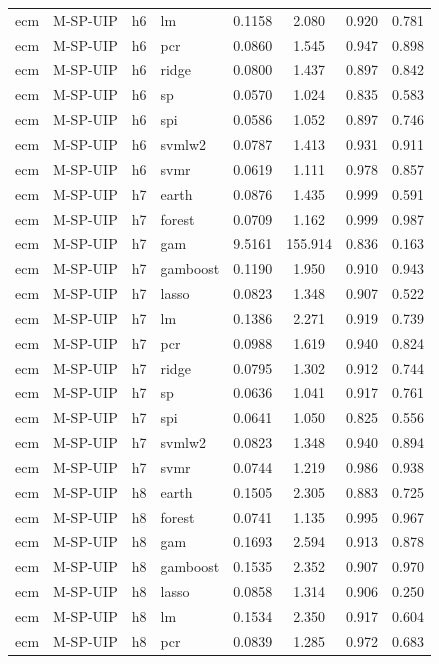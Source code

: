 \begin{ThreePartTable}
\begin{longtable}[t]{llclcccc}
ecm & M-SP-UIP & h6 & lm & 0.1158 & 2.080 & 0.920 & 0.781\\
ecm & M-SP-UIP & h6 & pcr & 0.0860 & 1.545 & 0.947 & 0.898\\
ecm & M-SP-UIP & h6 & ridge & 0.0800 & 1.437 & 0.897 & 0.842\\
ecm & M-SP-UIP & h6 & sp & 0.0570 & 1.024 & 0.835 & 0.583\\
ecm & M-SP-UIP & h6 & spi & 0.0586 & 1.052 & 0.897 & 0.746\\
ecm & M-SP-UIP & h6 & svmlw2 & 0.0787 & 1.413 & 0.931 & 0.911\\
ecm & M-SP-UIP & h6 & svmr & 0.0619 & 1.111 & 0.978 & 0.857\\
\addlinespace
ecm & M-SP-UIP & h7 & earth & 0.0876 & 1.435 & 0.999 & 0.591\\
ecm & M-SP-UIP & h7 & forest & 0.0709 & 1.162 & 0.999 & 0.987\\
ecm & M-SP-UIP & h7 & gam & 9.5161 & 155.914 & 0.836 & 0.163\\
ecm & M-SP-UIP & h7 & gamboost & 0.1190 & 1.950 & 0.910 & 0.943\\
ecm & M-SP-UIP & h7 & lasso & 0.0823 & 1.348 & 0.907 & 0.522\\
ecm & M-SP-UIP & h7 & lm & 0.1386 & 2.271 & 0.919 & 0.739\\
ecm & M-SP-UIP & h7 & pcr & 0.0988 & 1.619 & 0.940 & 0.824\\
ecm & M-SP-UIP & h7 & ridge & 0.0795 & 1.302 & 0.912 & 0.744\\
ecm & M-SP-UIP & h7 & sp & 0.0636 & 1.041 & 0.917 & 0.761\\
ecm & M-SP-UIP & h7 & spi & 0.0641 & 1.050 & 0.825 & 0.556\\
ecm & M-SP-UIP & h7 & svmlw2 & 0.0823 & 1.348 & 0.940 & 0.894\\
ecm & M-SP-UIP & h7 & svmr & 0.0744 & 1.219 & 0.986 & 0.938\\
\addlinespace
ecm & M-SP-UIP & h8 & earth & 0.1505 & 2.305 & 0.883 & 0.725\\
ecm & M-SP-UIP & h8 & forest & 0.0741 & 1.135 & 0.995 & 0.967\\
ecm & M-SP-UIP & h8 & gam & 0.1693 & 2.594 & 0.913 & 0.878\\
ecm & M-SP-UIP & h8 & gamboost & 0.1535 & 2.352 & 0.907 & 0.970\\
ecm & M-SP-UIP & h8 & lasso & 0.0858 & 1.314 & 0.906 & 0.250\\
ecm & M-SP-UIP & h8 & lm & 0.1534 & 2.350 & 0.917 & 0.604\\
ecm & M-SP-UIP & h8 & pcr & 0.0839 & 1.285 & 0.972 & 0.683\\

\end{longtable}
\end{ThreePartTable}
